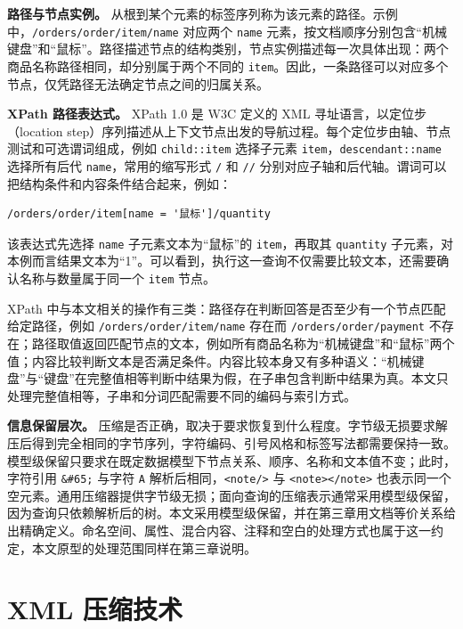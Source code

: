 \textbf{路径与节点实例。} 从根到某个元素的标签序列称为该元素的路径。示例中，\texttt{/orders/order/item/name} 对应两个 \texttt{name} 元素，按文档顺序分别包含“机械键盘”和“鼠标”。路径描述节点的结构类别，节点实例描述每一次具体出现：两个商品名称路径相同，却分别属于两个不同的 \texttt{item}。因此，一条路径可以对应多个节点，仅凭路径无法确定节点之间的归属关系。

\textbf{XPath 路径表达式。} XPath 1.0 是 W3C 定义的 XML 寻址语言，以定位步（location step）序列描述从上下文节点出发的导航过程\cite{clark1999xpath}。每个定位步由轴、节点测试和可选谓词组成，例如 \texttt{child::item} 选择子元素 \texttt{item}，\texttt{descendant::name} 选择所有后代 \texttt{name}，常用的缩写形式 \texttt{/} 和 \texttt{//} 分别对应子轴和后代轴。谓词可以把结构条件和内容条件结合起来，例如：
\begin{lstlisting}[caption={带有内容条件的路径查询示例},label={lst:foundation-xpath},numbers=none]
/orders/order/item[name = '鼠标']/quantity
\end{lstlisting}
该表达式先选择 \texttt{name} 子元素文本为“鼠标”的 \texttt{item}，再取其 \texttt{quantity} 子元素，对本例而言结果文本为“1”。可以看到，执行这一查询不仅需要比较文本，还需要确认名称与数量属于同一个 \texttt{item} 节点。

XPath 中与本文相关的操作有三类：路径存在判断回答是否至少有一个节点匹配给定路径，例如 \texttt{/orders/order/item/name} 存在而 \texttt{/orders/order/payment} 不存在；路径取值返回匹配节点的文本，例如所有商品名称为“机械键盘”和“鼠标”两个值；内容比较判断文本是否满足条件。内容比较本身又有多种语义：“机械键盘”与“键盘”在完整值相等判断中结果为假，在子串包含判断中结果为真。本文只处理完整值相等，子串和分词匹配需要不同的编码与索引方式。

\textbf{信息保留层次。} 压缩是否正确，取决于要求恢复到什么程度。字节级无损要求解压后得到完全相同的字节序列，字符编码、引号风格和标签写法都需要保持一致。模型级保留只要求在既定数据模型下节点关系、顺序、名称和文本值不变；此时，字符引用 \texttt{\&\#65;} 与字符 \texttt{A} 解析后相同，\texttt{<note/>} 与 \texttt{<note></note>} 也表示同一个空元素\cite{w3c2008xml}。通用压缩器提供字节级无损；面向查询的压缩表示通常采用模型级保留，因为查询只依赖解析后的树。本文采用模型级保留，并在第三章用文档等价关系给出精确定义。命名空间、属性、混合内容、注释和空白的处理方式也属于这一约定，本文原型的处理范围同样在第三章说明。

\section{XML 压缩技术}

